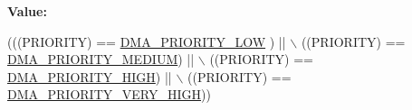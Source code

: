 {\bfseries Value\-:}
\begin{DoxyCode}
(((PRIORITY) == \hyperlink{group___d_m_a___priority__level_ga0d1ed2bc9229ba3c953002bcf3a72130}{DMA\_PRIORITY\_LOW} )   || \(\backslash\)
                                   ((PRIORITY) == \hyperlink{group___d_m_a___priority__level_gad6fbeee76fd4a02cbed64365bb4c1781}{DMA\_PRIORITY\_MEDIUM}) || \(\backslash\)
                                   ((PRIORITY) == \hyperlink{group___d_m_a___priority__level_ga6b2f5c5e22895f8b4bd52a27ec6cae2a}{DMA\_PRIORITY\_HIGH})   || \(\backslash\)
                                   ((PRIORITY) == \hyperlink{group___d_m_a___priority__level_gaed0542331a4d875d1d8d5b2878e9372c}{DMA\_PRIORITY\_VERY\_HIGH}))
\end{DoxyCode}
